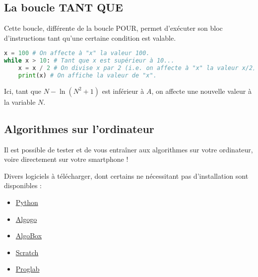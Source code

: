 	\subsection{La boucle TANT QUE}

	Cette boucle, différente de la boucle POUR, permet d'exécuter son bloc d'instructions tant qu'une certaine condition est valable.

	\begin{formula}[En python]
		\entretitreetliste
\begin{lstlisting}[language=python]
x = 100 # On affecte à "x" la valeur 100.
while x > 10: # Tant que x est supérieur à 10...
	x = x / 2 # On divise x par 2 (i.e. on affecte à "x" la valeur x/2).
	print(x) # On affiche la valeur de "x".
\end{lstlisting}
	\end{formula}

	\begin{tip}
		Ici, tant que $N - \ln(N^2 + 1)$ est inférieur à $A$, on affecte une nouvelle valeur à la variable $N$.
	\end{tip}

	\begin{nosummary}
		\section{Algorithmes sur l'ordinateur}

		Il est possible de tester et de vous entraîner aux algorithmes sur votre ordinateur, voire directement sur votre smartphone !

		\begin{tip}
			Divers logiciels à télécharger, dont certains ne nécessitant pas d'installation sont disponibles :
			\begin{itemize}
				\item \href{https://python.org}{Python}
				\item \href{https://www.algogo.xyz}{Algogo}
				\item \href{http://www.xm1math.net/algobox/}{AlgoBox}
				\item \href{https://scratch.mit.edu/}{Scratch}
				\item \href{http://proglab.fr/}{Proglab}
			\end{itemize}
		\end{tip}
	\end{nosummary}

